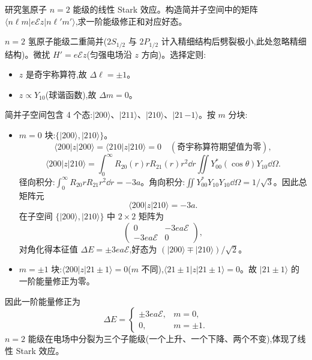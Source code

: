 \begin{question}
研究氢原子 $n=2$ 能级的线性 Stark 效应。构造简并子空间中的矩阵 $\langle n\ell m|e\mathcal Ez|n\ell' m'\rangle$,求一阶能级修正和对应好态。
\begin{solution}
$n=2$ 氢原子能级二重简并($2S_{1/2}$ 与 $2P_{1/2}$ 计入精细结构后劈裂极小,此处忽略精细结构)。微扰 $H'=e\mathcal Ez$(匀强电场沿 $z$ 方向)。选择定则:
\begin{itemize}
\item $z$ 是奇宇称算符,故 $\Delta\ell=\pm1$。
\item $z\propto Y_{10}$(球谐函数),故 $\Delta m=0$。
\end{itemize}

简并子空间包含 4 个态:$|200\rangle$、$|211\rangle$、$|210\rangle$、$|21\,{-1}\rangle$。按 $m$ 分块:
\begin{itemize}
\item $m=0$ 块:$\{|200\rangle,|210\rangle\}$。
  \[
  \langle200|z|200\rangle = \langle210|z|210\rangle = 0\quad(\text{奇宇称算符期望值为零}),
  \]
  \[
  \langle200|z|210\rangle = \int_0^\infty R_{20}(r)r R_{21}(r)r^2\dd r\iint Y_{00}^*(\cos\theta)Y_{10}\dd\Omega.
  \]
  径向积分:$\int_0^\infty R_{20}rR_{21}r^2\dd r = -3a$。角向积分:$\iint Y_{00}^*Y_{10}Y_{10}\dd\Omega = 1/\sqrt3$。因此总矩阵元
  \[
  \langle200|z|210\rangle = -3a.
  \]
  在子空间 $\{|200\rangle,|210\rangle\}$ 中 $2\times2$ 矩阵为
  \[
  \begin{pmatrix}0 & -3ea\mathcal E\\ -3ea\mathcal E & 0\end{pmatrix},
  \]
  对角化得本征值 $\Delta E = \pm 3ea\mathcal E$,好态为 $(|200\rangle\mp|210\rangle)/\sqrt2$。

\item $m=\pm1$ 块:$\langle200|z|21\pm1\rangle = 0$($m$ 不同),$\langle21\pm1|z|21\pm1\rangle=0$。故 $|21\pm1\rangle$ 的一阶能量修正为零。
\end{itemize}

因此一阶能量修正为
\[
\boxed{\Delta E = \begin{cases}
\pm 3ea\mathcal E, & m=0,\\ 0, & m=\pm1.
\end{cases}}
\]
$n=2$ 能级在电场中分裂为三个子能级(一个上升、一个下降、两个不变),体现了线性 Stark 效应。
\end{solution}
\end{question}

